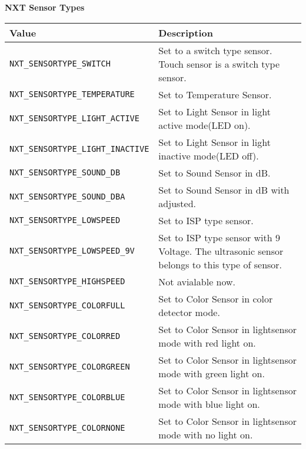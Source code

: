 \noindent
{\bf NXT Sensor Types}\\
\begin{longtable}{p{5.5cm}p{10cm}}
Value &       Description\\
\hline
{\tt NXT\_SENSORTYPE\_SWITCH}        &Set to a switch type sensor. Touch sensor is a switch type sensor.\\
{\tt NXT\_SENSORTYPE\_TEMPERATURE}   &Set to Temperature Sensor.\\
{\tt NXT\_SENSORTYPE\_LIGHT\_ACTIVE} &Set to Light Sensor in light active mode(LED on).\\
{\tt NXT\_SENSORTYPE\_LIGHT\_INACTIVE}&Set to Light Sensor in light inactive mode(LED off).\\
{\tt NXT\_SENSORTYPE\_SOUND\_DB}     &Set to Sound Sensor in dB.\\
{\tt NXT\_SENSORTYPE\_SOUND\_DBA}    &Set to Sound Sensor in dB with adjusted.\\
{\tt NXT\_SENSORTYPE\_LOWSPEED}      &Set to ISP type sensor.\\
{\tt NXT\_SENSORTYPE\_LOWSPEED\_9V}  &Set to ISP type sensor with 9 Voltage. The ultrasonic sensor belongs to this type of sensor.\\
{\tt NXT\_SENSORTYPE\_HIGHSPEED}     &Not avialable now.\\
{\tt NXT\_SENSORTYPE\_COLORFULL}     &Set to Color Sensor in color detector mode.\\
{\tt NXT\_SENSORTYPE\_COLORRED}      &Set to Color Sensor in lightsensor mode with red light on.\\
{\tt NXT\_SENSORTYPE\_COLORGREEN}    &Set to Color Sensor in lightsensor mode with green light on.\\
{\tt NXT\_SENSORTYPE\_COLORBLUE}     &Set to Color Sensor in lightsensor mode with blue light on.\\
{\tt NXT\_SENSORTYPE\_COLORNONE}     &Set to Color Sensor in lightsensor mode with no light on.\\
\hline
\end{longtable}

